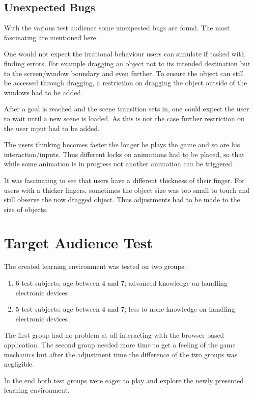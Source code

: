 \subsection{Unexpected Bugs}\label{subsec:unexpected-bugs}
With the various test audience some unexpected bugs are found. The most fascinating are mentioned here.

One would not expect the irrational behaviour users can simulate if tasked with finding errors.
For example dragging an object not to its intended destination but to the screen/window boundary and even further.
To ensure the object can still be accessed through dragging,
a restriction on dragging the object outside of the windows had to be added.

After a goal is reached and the scene transition sets in, one could expect the user to wait until a new scene is loaded.
As this is not the case further restriction on the user input had to be added.

The users thinking becomes faster the longer he plays the game and so are his interaction/inputs.
Thus different locks on animations had to be placed, so that while some animation is in progress not another animation can
be triggered.

It was fascinating to see that users have a different thickness of their finger.
For users with a thicker fingers, sometimes the object size was too small to touch and still observe the now dragged object.
Thus adjustments had to be made to the size of objects.

\section{Target Audience Test}\label{sec:target-audience-test}
The created learning environment was tested on two groups:
\begin{enumerate}
    \item 6 test subjects; age between 4 and 7; advanced knowledge on handling electronic devices
    \item 5 test subjects; age between 4 and 7; less to none knowledge on handling electronic devices
\end{enumerate}

The first group had no problem at all interacting with the browser based application.
The second group needed more time to get a feeling of the game mechanics but after the adjustment time the difference of
the two groups was negligible.

In the end both test groups were eager to play and explore the newly presented learning environment.

